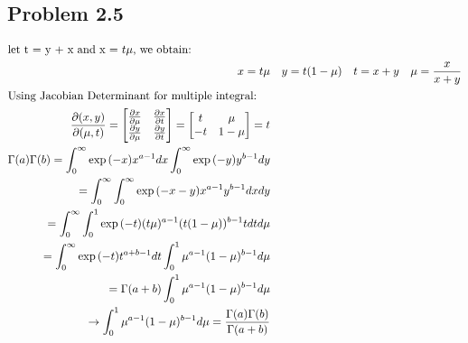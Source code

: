 \documentclass[12pt]{article}
\begin{document}
    \subsection*{Problem 2.5}
    \begin{align*}
        \intertext{let t = y + x and x = $t\mu$, we obtain:}
        x = t\mu && y = t(1 - \mu) && t = x + y && \mu = \frac{x}{x + y} \\
        \intertext{Using Jacobian Determinant for multiple integral:}
        \frac{\partial (x,y)}{\partial (\mu,t)} = \begin{bmatrix}
            \frac{\partial x}{\partial \mu} & \frac{\partial x}{\partial t} \\
            \frac{\partial y}{\partial \mu} & \frac{\partial y}{\partial t}
        \end{bmatrix}
        = \begin{bmatrix}
            t & \mu \\
            -t & 1 - \mu
        \end{bmatrix} = t \\
        \Gamma(a)\Gamma(b) = \int_{0}^{\infty}\exp{(-x)}x^{a - 1}dx\int_{0}^{\infty}\exp{(-y)}y^{b - 1}dy \\
        = \int_{0}^{\infty}\int_{0}^{\infty}\exp{(-x - y)}x^{a - 1}y^{b - 1}dxdy \\
        = \int_{0}^{\infty}\int_{0}^{1}\exp{(-t)}(t\mu)^{a - 1}(t(1 - \mu))^{b- 1}tdtd\mu \\
        = \int_{0}^{\infty}\exp{(-t)}t^{a + b - 1}dt\int_{0}^{1}\mu^{a - 1}(1 - \mu)^{b - 1}d\mu \\
        = \Gamma(a + b)\int_{0}^{1}\mu^{a - 1}(1 - \mu)^{b - 1}d\mu \\
        \rightarrow{\int_{0}^{1}\mu^{a - 1}(1 - \mu)^{b - 1}d\mu = \frac{\Gamma(a)\Gamma(b)}{\Gamma(a + b)}}
    \end{align*}
\end{document}
